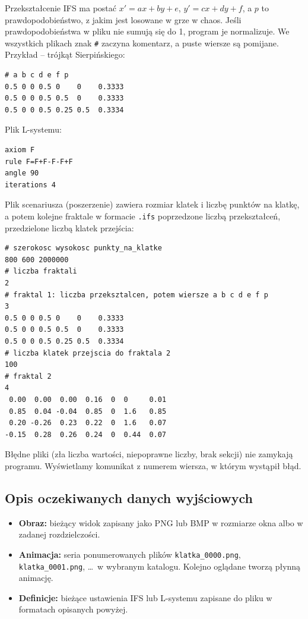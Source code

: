 \documentclass[11pt,a4paper]{article}
\newcommand{\kod}[1]{\texttt{#1}}
\begin{document}
Przekształcenie IFS ma postać $x' = ax + by + e$, $y' = cx + dy + f$, a $p$ to
prawdopodobieństwo, z jakim jest losowane w grze w chaos. Jeśli
prawdopodobieństwa w pliku nie sumują się do 1, program je normalizuje.
We wszystkich plikach znak \kod{\#} zaczyna komentarz, a puste wiersze są
pomijane. Przykład -- trójkąt Sierpińskiego:

\begin{Verbatim}
# a b c d e f p
0.5 0 0 0.5 0    0    0.3333
0.5 0 0 0.5 0.5  0    0.3333
0.5 0 0 0.5 0.25 0.5  0.3334
\end{Verbatim}

Plik L-systemu:
\begin{Verbatim}
axiom F
rule F=F+F-F-F+F
angle 90
iterations 4
\end{Verbatim}

Plik scenariusza (poszerzenie) zawiera rozmiar klatek i liczbę punktów na
klatkę, a potem kolejne fraktale w formacie \kod{.ifs} poprzedzone liczbą
przekształceń, przedzielone liczbą klatek przejścia:

\begin{Verbatim}
# szerokosc wysokosc punkty_na_klatke
800 600 2000000
# liczba fraktali
2
# fraktal 1: liczba przeksztalcen, potem wiersze a b c d e f p
3
0.5 0 0 0.5 0    0    0.3333
0.5 0 0 0.5 0.5  0    0.3333
0.5 0 0 0.5 0.25 0.5  0.3334
# liczba klatek przejscia do fraktala 2
100
# fraktal 2
4
 0.00  0.00  0.00  0.16  0  0     0.01
 0.85  0.04 -0.04  0.85  0  1.6   0.85
 0.20 -0.26  0.23  0.22  0  1.6   0.07
-0.15  0.28  0.26  0.24  0  0.44  0.07
\end{Verbatim}

Błędne pliki (zła liczba wartości, niepoprawne liczby, brak sekcji) nie
zamykają programu. Wyświetlamy komunikat z numerem wiersza, w którym wystąpił
błąd.

\subsection{Opis oczekiwanych danych wyjściowych}

\begin{itemize}
  \item \textbf{Obraz:} bieżący widok zapisany jako PNG lub BMP w rozmiarze
        okna albo w zadanej rozdzielczości.
  \item \textbf{Animacja:} seria ponumerowanych plików
        \kod{klatka\_0000.png}, \kod{klatka\_0001.png}, \ldots\ w wybranym
        katalogu. Kolejno oglądane tworzą płynną animację.
  \item \textbf{Definicje:} bieżące ustawienia IFS lub L-systemu zapisane do
        pliku w formatach opisanych powyżej.
\end{itemize}
\end{document}
